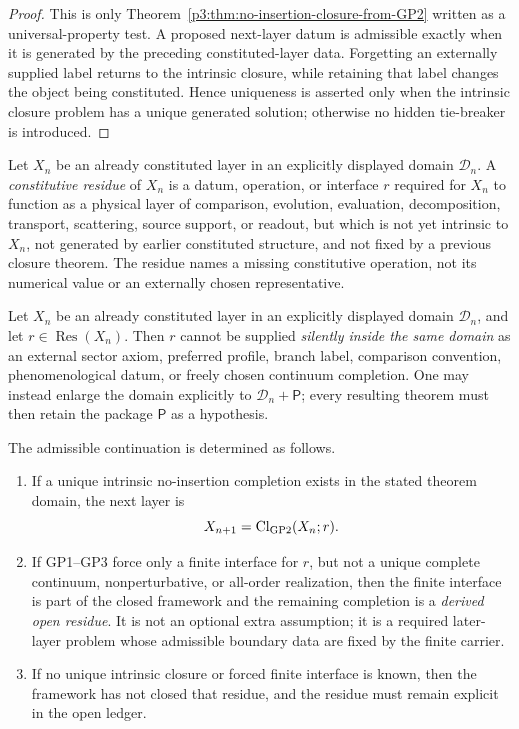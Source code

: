 \documentclass[11pt,a4paper]{article}
\begin{document}
\begin{proof}
This is only Theorem~\ref{p3:thm:no-insertion-closure-from-GP2} written as a universal-property test.  A proposed next-layer datum is admissible exactly when it is generated by the preceding constituted-layer data.  Forgetting an externally supplied label returns to the intrinsic closure, while retaining that label changes the object being constituted.  Hence uniqueness is asserted only when the intrinsic closure problem has a unique generated solution; otherwise no hidden tie-breaker is introduced.
\end{proof}
\begin{definition}
\label{p3:def:constitutive-residue}
Let \(X_n\) be an already constituted layer in an explicitly displayed
domain \(\mathcal D_n\).  A
\emph{constitutive residue} of \(X_n\) is a datum, operation, or interface
\(r\) required for \(X_n\) to function as a physical layer of comparison,
evolution, evaluation, decomposition, transport, scattering, source support,
or readout, but which is not yet intrinsic to \(X_n\), not generated by
earlier constituted structure, and not fixed by a previous closure theorem.
The residue names a missing constitutive operation, not its numerical value or
an externally chosen representative.
\end{definition}

\begin{theorem}
\label{p3:thm:constitutive-residue-closure}
Let \(X_n\) be an already constituted layer in an explicitly displayed
domain \(\mathcal D_n\), and let
\(r\in\operatorname{Res}(X_n)\).  Then \(r\) cannot be supplied
\emph{silently inside the same domain} as an external sector axiom, preferred
profile, branch label, comparison convention, phenomenological datum, or
freely chosen continuum completion.  One may instead enlarge the domain
explicitly to \(\mathcal D_n+\mathsf P\); every resulting theorem must then
retain the package \(\mathsf P\) as a hypothesis.

The admissible continuation is determined as follows.
\begin{enumerate}[label=(\roman*), leftmargin=2em]
\item If a unique intrinsic no-insertion completion exists in the stated theorem
      domain, the next layer is
\[
X_{n+1}=\operatorname{Cl}_{\rm GP2}(X_n;r).
\]
\item If GP1--GP3 force only a finite interface for \(r\), but not a unique
      complete continuum, nonperturbative, or all-order realization, then the
      finite interface is part of the closed framework and the remaining
      completion is a \emph{derived open residue}.  It is not an optional extra
      assumption; it is a required later-layer problem whose admissible boundary
      data are fixed by the finite carrier.
\item If no unique intrinsic closure or forced finite interface is known, then
      the framework has not closed that residue, and the residue must remain
      explicit in the open ledger.
\end{enumerate}
\end{theorem}
\end{document}
